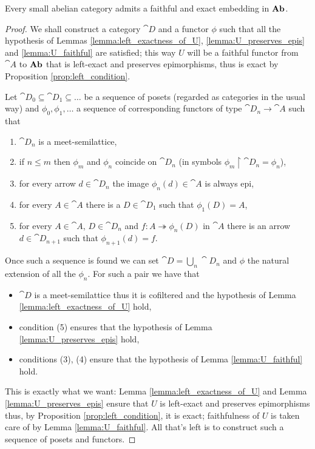 \begin{theorem}
  \label{teo:faithful_embedding}
  Every small abelian category admits a faithful and exact embedding in \(\text{\normalfont\textbf{Ab}}\).
\end{theorem}

\begin{proof}
  We shall construct a category \(\cat{D}\) and a functor \(\phi\) such that all the hypothesis of Lemmas \ref{lemma:left_exactness_of_U}, \ref{lemma:U_preserves_epis} and \ref{lemma:U_faithful} are satisfied; this way \(U\) will be a faithful functor from \(\cat{A}\) to \(\text{\normalfont\textbf{Ab}}\) that is left-exact and preserves epimorphisms, thus is exact by Proposition \ref{prop:left_condition}.

  Let \(\cat{D}_0\subseteq\cat{D}_1\subseteq\ldots\) be a sequence of posets (regarded as categories in the usual way) and \(\phi_0,\phi_1,\ldots\) a sequence of corresponding functors of type \(\cat{D}_n\to\cat{A}\) such that
  \begin{enumerate}[label=(\arabic*)]
  \item \(\cat{D}_n\) is a meet-semilattice,
  \item if \(n\leq m\) then \(\phi_m\) and \(\phi_n\) coincide on \(\cat{D}_n\) (in symbols \(\phi_m\upharpoonright\cat{D}_n=\phi_n\)),
  \item for every arrow \(d\in\cat{D}_n\) the image \(\phi_n(d)\in\cat{A}\) is always epi,
  \item for every \(A\in\cat{A}\) there is a \(D\in\cat{D}_1\) such that \(\phi_1(D) = A\),
  \item for every \(A\in\cat{A}\), \(D\in\cat{D}_n\) and \(f\colon A\twoheadrightarrow\phi_n(D)\) in \(\cat{A}\) there is an arrow \(d\in\cat{D}_{n+1}\) such that \(\phi_{n+1}(d) = f\).
  \end{enumerate}
  Once such a sequence is found we can set \(\cat{D} = \bigcup_n\cat{D}_n\) and \(\phi\) the natural extension of all the \(\phi_n\). For such a pair we have that
  \begin{itemize}
  \item \(\cat{D}\) is a meet-semilattice thus it is cofiltered and the hypothesis of Lemma \ref{lemma:left_exactness_of_U} hold,
  \item condition (5) ensures that the hypothesis of Lemma \ref{lemma:U_preserves_epis} hold,
  \item conditions (3), (4) ensure that the hypothesis of Lemma \ref{lemma:U_faithful} hold.
  \end{itemize}
  This is exactly what we want: Lemma \ref{lemma:left_exactness_of_U} and Lemma \ref{lemma:U_preserves_epis} ensure that \(U\) is left-exact and preserves epimorphisms thus, by Proposition \ref{prop:left_condition}, it is exact; faithfulness of \(U\) is taken care of by Lemma \ref{lemma:U_faithful}. All that's left is to construct such a sequence of posets and functors.


\end{proof}
